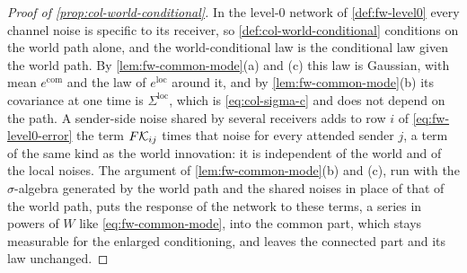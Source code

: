 \begin{proof}[Proof of \cref{prop:col-world-conditional}]
In the level-0 network of \cref{def:fw-level0} every channel noise is specific to its receiver, so \cref{def:col-world-conditional} conditions on the world path alone, and the world-conditional law is the conditional law given the world path. By \cref{lem:fw-common-mode}(a) and (c) this law is Gaussian, with mean $e^{\mathrm{com}}$ and the law of $e^{\mathrm{loc}}$ around it, and by \cref{lem:fw-common-mode}(b) its covariance at one time is $\Sigma^{\mathrm{loc}}$, which is \eqref{eq:col-sigma-c} and does not depend on the path. A sender-side noise shared by several receivers adds to row $i$ of \eqref{eq:fw-level0-error} the term $F\mathcal{K}_{ij}$ times that noise for every attended sender $j$, a term of the same kind as the world innovation: it is independent of the world and of the local noises. The argument of \cref{lem:fw-common-mode}(b) and (c), run with the $\sigma$-algebra generated by the world path and the shared noises in place of that of the world path, puts the response of the network to these terms, a series in powers of $W$ like \eqref{eq:fw-common-mode}, into the common part, which stays measurable for the enlarged conditioning, and leaves the connected part and its law unchanged.
\end{proof}

